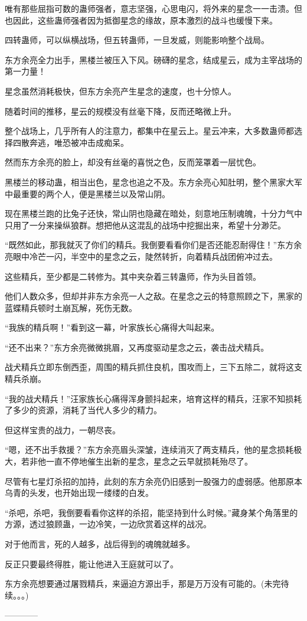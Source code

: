 \begin{this_body}
唯有那些屈指可数的蛊师强者，意志坚强，心思电闪，将外来的星念一一击溃。但也因此，这些蛊师强者因为抵御星念的缘故，原本激烈的战斗也缓慢下来。

四转蛊师，可以纵横战场，但五转蛊师，一旦发威，则能影响整个战局。

东方余亮全力出手，黑楼兰被压入下风。磅礴的星念，结成星云，成为主宰战场的第一力量！

星念虽然消耗极快，但东方余亮产生星念的速度，也十分惊人。

随着时间的推移，星云的规模没有丝毫下降，反而还略微上升。

整个战场上，几乎所有人的注意力，都集中在星云上。星云冲来，大多数蛊师都选择四散奔逃，唯恐被冲击成痴呆。

然而东方余亮的脸上，却没有丝毫的喜悦之色，反而笼罩着一层忧色。

黑楼兰的移动蛊，相当出色，星念也追之不及。东方余亮心知肚明，整个黑家大军中最重要的两个人，便是黑楼兰以及常山阴。

现在黑楼兰跑的比兔子还快，常山阴也隐藏在暗处，刻意地压制魂魄，十分力气中只用了一分来操纵狼群。想把他从这混乱的战场中挖掘出来，希望十分渺茫。

“既然如此，那我就灭了你们的精兵。我倒要看看你们是否还能忍耐得住！”东方余亮眼中冷芒一闪，半空中的星念之云，陡然转折，向着精兵战团俯冲过去。

这些精兵，至少都是二转修为。其中夹杂着三转蛊师，作为头目首领。

他们人数众多，但却并非东方余亮一人之敌。在星念之云的特意照顾之下，黑家的蓝蝶精兵顿时土崩瓦解，死伤无数。

“我族的精兵啊！”看到这一幕，叶家族长心痛得大叫起来。

“还不出来？”东方余亮微微挑眉，又再度驱动星念之云，袭击战犬精兵。

战犬精兵立即东倒西歪，周围的精兵抓住良机，围攻而上，三下五除二，就将这支精兵杀崩。

“我的战犬精兵！”汪家族长心痛得浑身颤抖起来，培育这样的精兵，汪家不知损耗了多少的资源，消耗了当代人多少的精力。

但这样宝贵的战力，一朝尽丧。

“嗯，还不出手救援？”东方余亮眉头深皱，连续消灭了两支精兵，他的星念损耗极大，若非他一直不停地催生出新的星念，星念之云早就损耗殆尽了。

尽管有七星灯杀招的加持，此刻的东方余亮仍旧感到一股强力的虚弱感。他那原本乌青的头发，也开始出现一缕缕的白发。

“杀吧，杀吧，我倒要看看你这样的杀招，能坚持到什么时候。”藏身某个角落里的方源，透过狼顾蛊，一边冷笑，一边欣赏着这样的战况。

对于他而言，死的人越多，战后得到的魂魄就越多。

反正只要最终得胜，能让他进入王庭就可以了。

东方余亮想要通过屠戮精兵，来逼迫方源出手，那是万万没有可能的。(未完待续。。。)

------------

\end{this_body}

